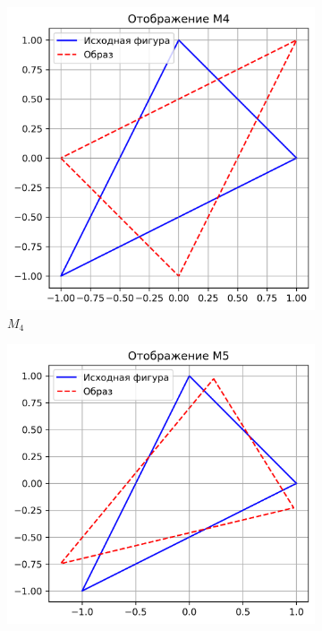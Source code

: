 \begin{figure}[H]
  \begin{subfigure}[b]{0.3\textwidth}
    \includegraphics[width=\linewidth]{plots/M4.png}
    \caption{$M_4$}
  \end{subfigure}\hfill
  \begin{subfigure}[b]{0.3\textwidth}
    \includegraphics[width=\linewidth]{plots/M5.png}

\end{subfigure}
\end{figure}
